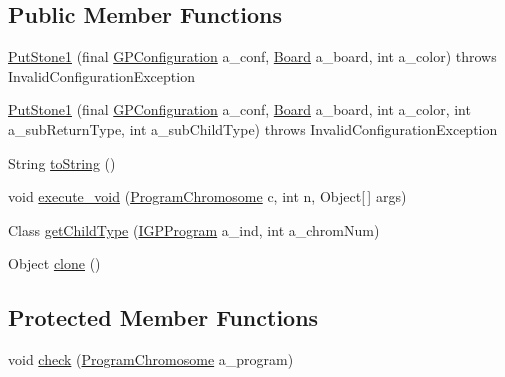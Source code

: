 \subsection*{Public Member Functions}
\begin{DoxyCompactItemize}
\item 
\hyperlink{classexamples_1_1gp_1_1tictactoe_1_1_put_stone1_a7bab36610a01310a248ebbd730dfeecd}{Put\-Stone1} (final \hyperlink{classorg_1_1jgap_1_1gp_1_1impl_1_1_g_p_configuration}{G\-P\-Configuration} a\-\_\-conf, \hyperlink{classexamples_1_1gp_1_1tictactoe_1_1_board}{Board} a\-\_\-board, int a\-\_\-color)  throws Invalid\-Configuration\-Exception 
\item 
\hyperlink{classexamples_1_1gp_1_1tictactoe_1_1_put_stone1_a509cb38d31a2ca98df41b36456ac6d51}{Put\-Stone1} (final \hyperlink{classorg_1_1jgap_1_1gp_1_1impl_1_1_g_p_configuration}{G\-P\-Configuration} a\-\_\-conf, \hyperlink{classexamples_1_1gp_1_1tictactoe_1_1_board}{Board} a\-\_\-board, int a\-\_\-color, int a\-\_\-sub\-Return\-Type, int a\-\_\-sub\-Child\-Type)  throws Invalid\-Configuration\-Exception 
\item 
String \hyperlink{classexamples_1_1gp_1_1tictactoe_1_1_put_stone1_af1e7b797b839e3e92ec6aa980c4ce5e9}{to\-String} ()
\item 
void \hyperlink{classexamples_1_1gp_1_1tictactoe_1_1_put_stone1_a7bb0324d2983b251c33e9ee528b2b767}{execute\-\_\-void} (\hyperlink{classorg_1_1jgap_1_1gp_1_1impl_1_1_program_chromosome}{Program\-Chromosome} c, int n, Object\mbox{[}$\,$\mbox{]} args)
\item 
Class \hyperlink{classexamples_1_1gp_1_1tictactoe_1_1_put_stone1_af8dfcc57fc9ce45acd0e65eda0ce4dca}{get\-Child\-Type} (\hyperlink{interfaceorg_1_1jgap_1_1gp_1_1_i_g_p_program}{I\-G\-P\-Program} a\-\_\-ind, int a\-\_\-chrom\-Num)
\item 
Object \hyperlink{classexamples_1_1gp_1_1tictactoe_1_1_put_stone1_ab1cb0ce312f98e2c374f277afddb57d4}{clone} ()
\end{DoxyCompactItemize}
\subsection*{Protected Member Functions}
\begin{DoxyCompactItemize}
\item 
void \hyperlink{classexamples_1_1gp_1_1tictactoe_1_1_put_stone1_a7b071c52e8470c7b024af37a3c6deb42}{check} (\hyperlink{classorg_1_1jgap_1_1gp_1_1impl_1_1_program_chromosome}{Program\-Chromosome} a\-\_\-program)
\end{DoxyCompactItemize}
